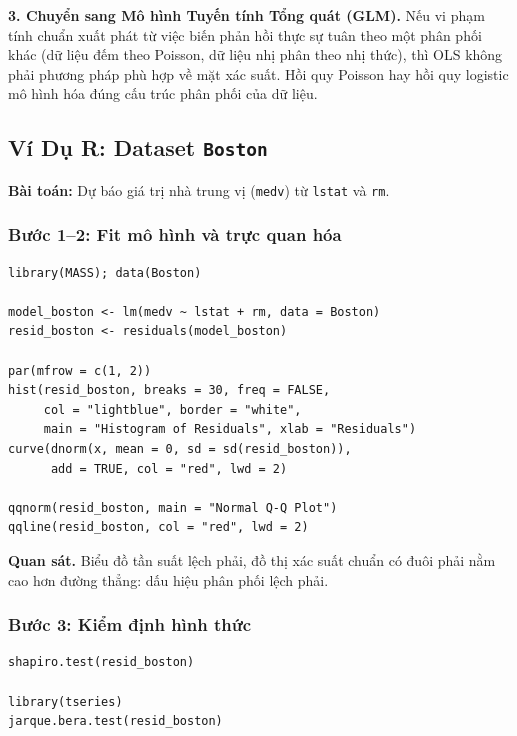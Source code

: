 \documentclass[12pt, a4paper]{article}
\begin{document}
\textbf{3. Chuyển sang Mô hình Tuyến tính Tổng quát (GLM).} Nếu vi phạm tính chuẩn xuất phát từ việc biến phản hồi thực sự tuân theo một phân phối khác (dữ liệu đếm theo Poisson, dữ liệu nhị phân theo nhị thức), thì OLS không phải phương pháp phù hợp về mặt xác suất. Hồi quy Poisson hay hồi quy logistic mô hình hóa đúng cấu trúc phân phối của dữ liệu.

\subsection{Ví Dụ R: Dataset \texttt{Boston}}

\textbf{Bài toán:} Dự báo giá trị nhà trung vị (\texttt{medv}) từ \texttt{lstat} và \texttt{rm}.

\subsubsection*{Bước 1--2: Fit mô hình và trực quan hóa}

\begin{lstlisting}[style=Rstyle]
library(MASS); data(Boston)

model_boston <- lm(medv ~ lstat + rm, data = Boston)
resid_boston <- residuals(model_boston)

par(mfrow = c(1, 2))
hist(resid_boston, breaks = 30, freq = FALSE,
     col = "lightblue", border = "white",
     main = "Histogram of Residuals", xlab = "Residuals")
curve(dnorm(x, mean = 0, sd = sd(resid_boston)),
      add = TRUE, col = "red", lwd = 2)

qqnorm(resid_boston, main = "Normal Q-Q Plot")
qqline(resid_boston, col = "red", lwd = 2)
\end{lstlisting}

\textbf{Quan sát.} Biểu đồ tần suất lệch phải, đồ thị xác suất chuẩn có đuôi phải nằm cao hơn đường thẳng: dấu hiệu phân phối lệch phải.

\subsubsection*{Bước 3: Kiểm định hình thức}

\begin{lstlisting}[style=Rstyle]
shapiro.test(resid_boston)

library(tseries)
jarque.bera.test(resid_boston)
\end{lstlisting}
\end{document}
